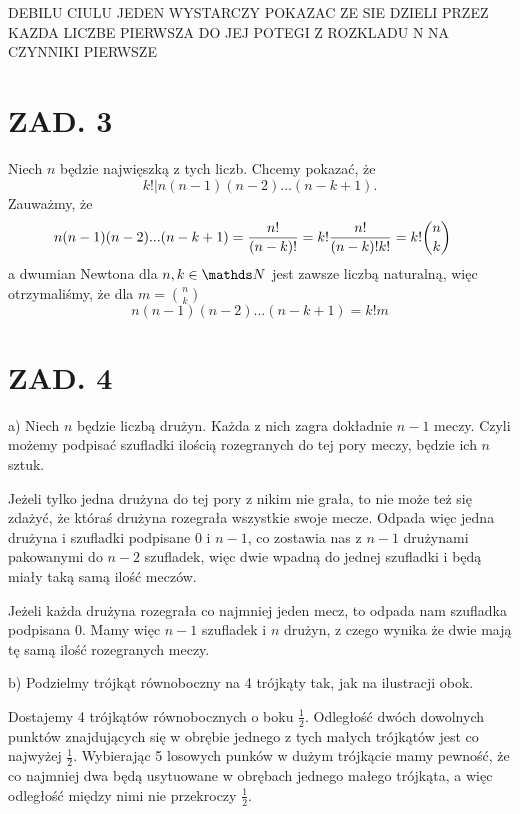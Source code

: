 \documentclass{article}[13pt]
\begin{document}
{\color{cyan}DEBILU CIULU JEDEN WYSTARCZY POKAZAC ZE SIE DZIELI PRZEZ KAZDA LICZBE PIERWSZA DO JEJ POTEGI Z ROZKLADU N NA CZYNNIKI PIERWSZE}

\section*{ZAD. 3}

Niech $n$ będzie najwięszką z tych liczb. Chcemy pokazać, że
$$k!|n(n-1)(n-2)...(n-k+1).$$
Zauważmy, że
\begin{align*}
    n(n-1)(n-2)...(n-k+1)&={n!\over(n-k)!}=k!{n!\over(n-k)!k!}=k!{n\choose k}
\end{align*}
a dwumian Newtona dla $n,k\in\N$ jest zawsze liczbą naturalną, więc otrzymaliśmy, że dla $m={n\choose k}$
$$n(n-1)(n-2)...(n-k+1)=k!m$$

\section*{ZAD. 4}

{\color{acc}a)} Niech $n$ będzie liczbą drużyn. Każda z nich zagra dokładnie $n-1$ meczy. Czyli możemy podpisać szufladki ilością rozegranych do tej pory meczy, będzie ich $n$ sztuk. 
\smallskip

Jeżeli tylko jedna drużyna do tej pory z nikim nie grała, to nie może też się zdażyć, że któraś drużyna rozegrała wszystkie swoje mecze. Odpada więc jedna drużyna i szufladki podpisane 0 i $n-1$, co zostawia nas z $n-1$ drużynami pakowanymi do $n-2$ szufladek, więc dwie wpadną do jednej szufladki i będą miały taką samą ilość meczów.
\smallskip

Jeżeli każda drużyna rozegrała co najmniej jeden mecz, to odpada nam szufladka podpisana 0. Mamy więc $n-1$ szufladek i $n$ drużyn, z czego wynika że dwie mają tę samą ilość rozegranych meczy.
\medskip

{\color{acc}b)} Podzielmy trójkąt równoboczny na 4 trójkąty tak, jak na ilustracji obok.
\begin{wrapfigure}{r}{0.25\textwidth}
\end{wrapfigure}
Dostajemy 4 trójkątów równobocznych o boku $\frac12$. Odległość dwóch dowolnych punktów znajdujących się w obrębie jednego z tych małych trójkątów jest co najwyżej $\frac12$. Wybierając 5 losowych punków w dużym trójkącie mamy pewność, że co najmniej dwa będą usytuowane w obrębach jednego małego trójkąta, a więc odległość między nimi nie przekroczy $\frac12$.
\medskip
\end{document}
